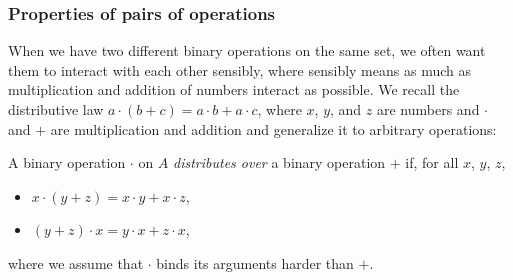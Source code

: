 \documentclass{article}
\begin{document}
\subsubsection{Properties of pairs of operations}
When we have two different binary operations on the same set, we often want them to interact with each other sensibly, where sensibly means as much as multiplication and addition of numbers interact as possible. We recall the distributive law $a\cdot(b + c) = a\cdot b + a\cdot c$, where $x$, $y$, and $z$ are numbers and $\cdot$ and $+$ are multiplication and addition and generalize it to arbitrary operations: 
\begin{Definition}
  A binary operation $\cdot$ on $A$ \emph{distributes over} a binary operation $+$ if, for all $x$, $y$, $z$,
  \begin{itemize}
  \item $x \cdot (y + z) = x \cdot y + x \cdot z$,
  \item $(y + z) \cdot x = y \cdot x + z \cdot x$,
  \end{itemize}
  where we assume that $\cdot$ binds its arguments harder than $+$.
\end{Definition}
\end{document}
